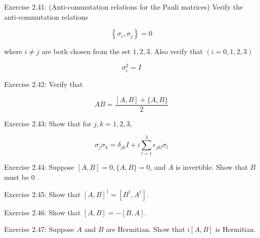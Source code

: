 Exercise 2.41: (Anti-commutation relations for the Pauli matrices) Verify the anti-commutation relations

$$
\left\{\sigma_{i}, \sigma_{j}\right\}=0
$$

where $i \neq j$ are both chosen from the set $1,2,3$. Also verify that $(i=0,1,2,3)$

$$
\sigma_{i}^{2}=I
$$

Exercise 2.42: Verify that

$$
A B=\frac{[A, B]+\{A, B\}}{2}
$$

Exercise 2.43: Show that for $j, k=1,2,3$,

$$
\sigma_{j} \sigma_{k}=\delta_{j k} I+i \sum_{l=1}^{3} \epsilon_{j k l} \sigma_{l}
$$

Exercise 2.44: Suppose $[A, B]=0,\{A, B\}=0$, and $A$ is invertible. Show that $B$ must be 0 .

Exercise 2.45: Show that $[A, B]^{\dagger}=\left[B^{\dagger}, A^{\dagger}\right]$.

Exercise 2.46: Show that $[A, B]=-[B, A]$.

Exercise 2.47: Suppose $A$ and $B$ are Hermitian. Show that $i[A, B]$ is Hermitian.